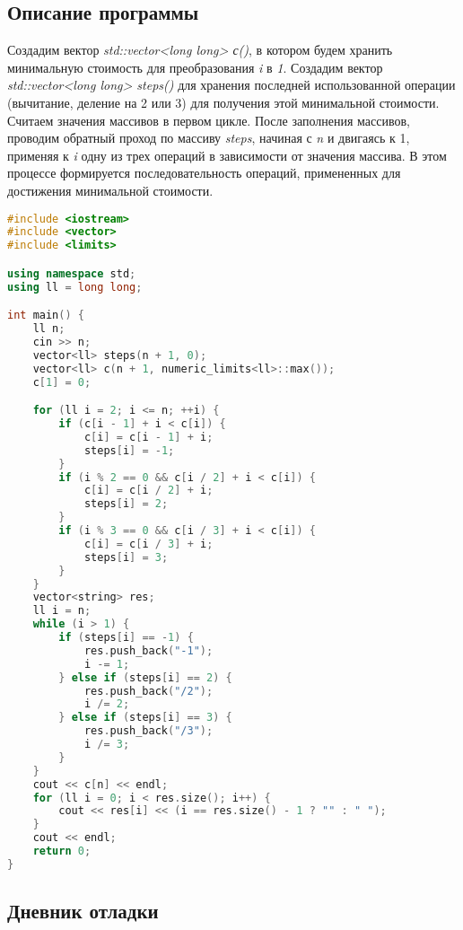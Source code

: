 \documentclass[12pt]{article}
\begin{document}
\subsection*{Описание программы}

Создадим вектор \textit{std::vector<long long> с()}, в котором будем хранить минимальную стоимость для преобразования \textit{i} в \textit{1}.
Создадим вектор \textit{std::vector<long long> steps()} для хранения последней использованной операции (вычитание, деление на 2 или 3) для получения этой минимальной стоимости.
Считаем значения массивов в первом цикле.
После заполнения массивов, проводим обратный проход по массиву \textit{steps}, начиная с \textit{ n } и двигаясь к 1, применяя к \textit{ i } одну из трех операций в зависимости от значения массива. В этом процессе формируется последовательность операций, примененных для достижения минимальной стоимости.

\begin{lstlisting}[language=C++]
#include <iostream>
#include <vector>
#include <limits>

using namespace std;
using ll = long long;

int main() {
    ll n;
    cin >> n;
    vector<ll> steps(n + 1, 0);
    vector<ll> c(n + 1, numeric_limits<ll>::max());
    c[1] = 0; 

    for (ll i = 2; i <= n; ++i) {
        if (c[i - 1] + i < c[i]) {
            c[i] = c[i - 1] + i;
            steps[i] = -1;
        }
        if (i % 2 == 0 && c[i / 2] + i < c[i]) {
            c[i] = c[i / 2] + i;
            steps[i] = 2;
        }
        if (i % 3 == 0 && c[i / 3] + i < c[i]) {
            c[i] = c[i / 3] + i;
            steps[i] = 3;
        }
    }
    vector<string> res;
    ll i = n;
    while (i > 1) {
        if (steps[i] == -1) {
            res.push_back("-1");
            i -= 1;
        } else if (steps[i] == 2) {
            res.push_back("/2");
            i /= 2;
        } else if (steps[i] == 3) {
            res.push_back("/3");
            i /= 3;
        }
    }
    cout << c[n] << endl;
    for (ll i = 0; i < res.size(); i++) {
        cout << res[i] << (i == res.size() - 1 ? "" : " ");
    }
    cout << endl;
    return 0;
}

\end{lstlisting}

\subsection*{Дневник отладки}
\end{document}
